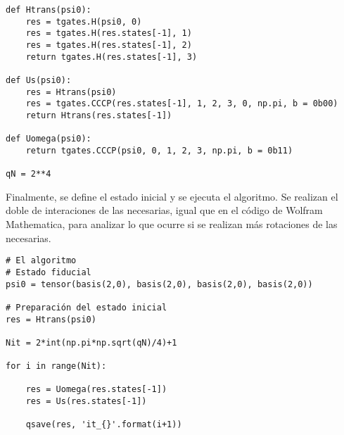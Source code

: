 \begin{verbatim}
def Htrans(psi0):
    res = tgates.H(psi0, 0)
    res = tgates.H(res.states[-1], 1)
    res = tgates.H(res.states[-1], 2)
    return tgates.H(res.states[-1], 3)

def Us(psi0):
    res = Htrans(psi0)
    res = tgates.CCCP(res.states[-1], 1, 2, 3, 0, np.pi, b = 0b00)
    return Htrans(res.states[-1])

def Uomega(psi0):
    return tgates.CCCP(psi0, 0, 1, 2, 3, np.pi, b = 0b11)

qN = 2**4
\end{verbatim}

Finalmente, se define el estado inicial y se ejecuta el algoritmo. Se realizan el doble de interaciones de las necesarias, igual que en el código de Wolfram Mathematica, para analizar lo que ocurre si se realizan más rotaciones de las necesarias.

\begin{verbatim}
# El algoritmo
# Estado fiducial
psi0 = tensor(basis(2,0), basis(2,0), basis(2,0), basis(2,0))

# Preparación del estado inicial
res = Htrans(psi0)

Nit = 2*int(np.pi*np.sqrt(qN)/4)+1

for i in range(Nit):
    
    res = Uomega(res.states[-1])
    res = Us(res.states[-1])
    
    qsave(res, 'it_{}'.format(i+1))

\end{verbatim}

